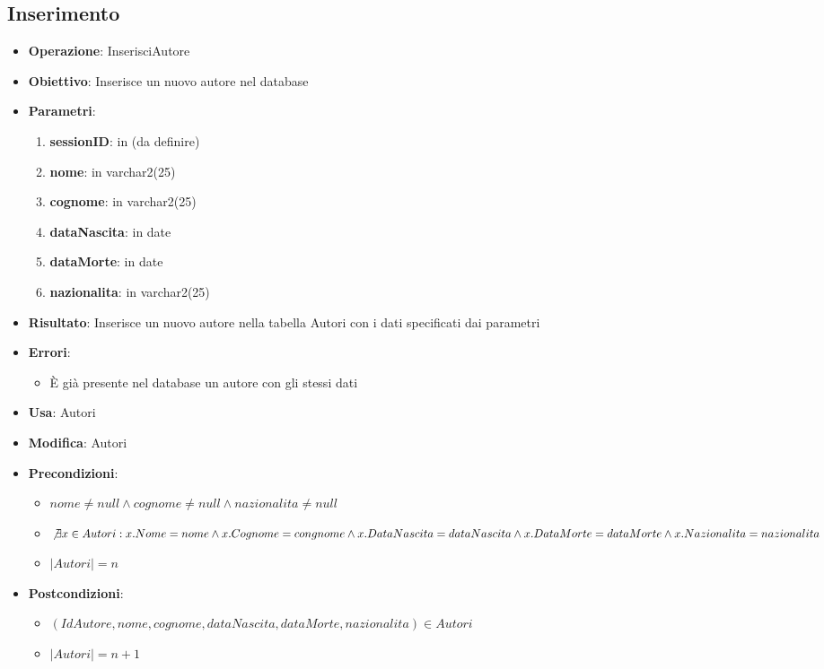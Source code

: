 \documentclass[a4paper,11pt]{article}
\begin{document}
\subsection{Inserimento}
\begin{itemize}
	\item \textbf{Operazione}: InserisciAutore
	\item \textbf{Obiettivo}: Inserisce un nuovo autore nel database
	\item \textbf{Parametri}:
	\begin{enumerate}
		\item \textbf{sessionID}: in (da definire)
		\item \textbf{nome}: in varchar2(25)
		\item \textbf{cognome}: in varchar2(25)
		\item \textbf{dataNascita}: in date
		\item \textbf{dataMorte}: in date
		\item \textbf{nazionalita}: in varchar2(25)
	\end{enumerate}
	\item \textbf{Risultato}: Inserisce un nuovo autore nella tabella Autori con i dati specificati dai parametri
	\item \textbf{Errori}: 
	\begin{itemize}
		\item È già presente nel database un autore con gli stessi dati
	\end{itemize}
	\item \textbf{Usa}: Autori
	\item \textbf{Modifica}: Autori
	\item \textbf{Precondizioni}:
	\begin{itemize}
		\item $nome \ne null \land cognome \ne null \land nazionalita \ne null$
		\item $\not\exists x \in Autori : x.Nome = nome \land x.Cognome = congnome 
		\land x.DataNascita = dataNascita \land x.DataMorte = dataMorte 
		\land x.Nazionalita = nazionalita$
		\item $|Autori| = n$
	\end{itemize}
	\item \textbf{Postcondizioni}:
	\begin{itemize}
		\item $(IdAutore,nome,cognome,dataNascita,dataMorte,nazionalita) \in Autori$
		\item $|Autori| = n + 1$
	\end{itemize}
\end{itemize}
\end{document}
